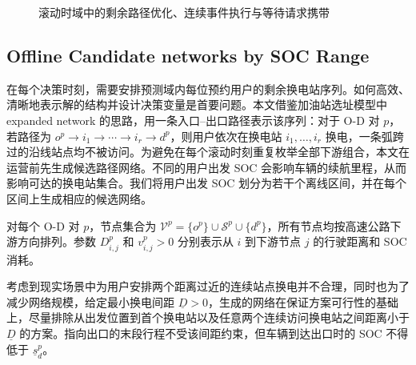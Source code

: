 \documentclass[12pt,a4paper,UTF8]{ctexart}
\begin{document}
\begin{figure}[!htbp]
  \centering
  \caption{滚动时域中的剩余路径优化、连续事件执行与等待请求携带}
  \label{fig:rolling_horizon}
\end{figure}


\subsection{Offline Candidate networks by SOC Range}

在每个决策时刻，需要安排预测域内每位预约用户的剩余换电站序列。如何高效、清晰地表示解的结构并设计决策变量是首要问题。本文借鉴加油站选址模型中 expanded network 的思路，用一条入口--出口路径表示该序列：对于 O-D 对 $p$，若路径为
$o^p\rightarrow i_1\rightarrow\cdots\rightarrow i_r\rightarrow d^p$，则用户依次在换电站 $i_1,\ldots,i_r$ 换电，一条弧跨过的沿线站点均不被访问。为避免在每个滚动时刻重复枚举全部下游组合，本文在运营前先生成候选路径网络。不同的用户出发 SOC 会影响车辆的续航里程，从而影响可达的换电站集合。我们将用户出发 SOC 划分为若干个离线区间，并在每个区间上生成相应的候选网络。

对每个 O-D 对 $p$，节点集合为
$\mathcal V^p=\{o^p\}\cup\mathcal S^p\cup\{d^p\}$，所有节点均按高速公路下游方向排列。参数 $D_{i,j}^p$ 和 $v_{i,j}^p>0$ 分别表示从 $i$ 到下游节点 $j$ 的行驶距离和 SOC 消耗。

考虑到现实场景中为用户安排两个距离过近的连续站点换电并不合理，同时也为了减少网络规模，给定最小换电间距 $\underline D>0$，生成的网络在保证方案可行性的基础上，尽量排除从出发位置到首个换电站以及任意两个连续访问换电站之间距离小于 $\underline D$ 的方案。指向出口的末段行程不受该间距约束，但车辆到达出口时的 SOC 不得低于 $\underline s_d^p$。
\end{document}
